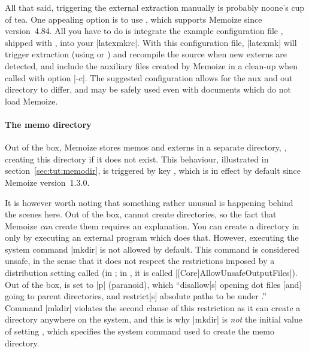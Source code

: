 \documentclass[a4paper,11pt]{article}
\begin{document}
All that said, triggering the external extraction manually is probably noone's
cup of tea.  One appealing option is to use , which supports
Memoize since version~4.84.  All you have to do is integrate the example
configuration file , shipped with ,
into your |latexmkrc|.  With this configuration file, |latexmk| will trigger
extraction (using  or
) and recompile the source when new externs are
detected, and include the auxiliary files created by Memoize in a clean-up when
called with option |-c|.  The suggested configuration allows for the aux and
out directory to differ, and may be safely used even with documents which do not
load Memoize.

\paragraph{The memo directory}

Out of the box, Memoize stores memos and externs in a separate directory,
, creating this directory if it does not
exist.  This behaviour, illustrated in section~\ref{sec:tut:memodir}, is
triggered by key , which is in effect by default since Memoize
version~1.3.0.

It is however worth noting that something rather unusual is happening behind
the scenes here.  Out of the box,  cannot create directories, so
the fact that Memoize \emph{can} create them requires an explanation.  You can
create a directory in  only by executing an external program which
does that.  However, executing the system command |mkdir| is not allowed by
default.  This command is considered unsafe, in the sense that it does not
respect the restrictions imposed by a  distribution setting called
 (in \TeXLive; in \MiKTeX, it is called
|[Core]AllowUnsafeOutputFiles|).  Out of the box,  is set
to |p| (paranoid), which ``disallow[s] opening dot files [and] going to parent
directories, and restrict[s] absolute paths to be under .''
Command |mkdir| violates the second clause of this restriction as it can create
a directory anywhere on the system, and this is why |mkdir| is \emph{not} the
initial value of setting , which specifies the system
command used to create the memo directory.
\end{document}
